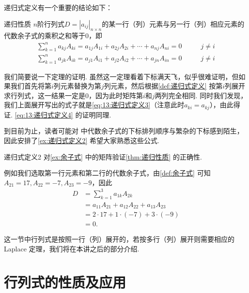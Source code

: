 递归式定义有一个重要的结论如下：
\begin{theorem}{}{递归性质}
    $n$阶行列式$D=|a_{ij}|_{n \times n}$的某一行（列）元素与另一行（列）相应元素的代数余子式的乘积之和等于0，即
    \begin{align}
        \label{eq:13:递归式定义3}
        \sum_{k=1}^{n}a_{kj}A_{ki}=a_{1j}A_{1i}+a_{2j}A_{2i}+\cdots+a_{nj}A_{ni}=0 & \qquad j \neq i \\
        \label{eq:13:递归式定义4}
        \sum_{k=1}^{n}a_{jk}A_{ik}=a_{j1}A_{i1}+a_{j2}A_{i2}+\cdots+a_{jn}A_{in}=0 & \qquad j \neq i
    \end{align}
\end{theorem}

我们简要说一下定理的证明. 虽然这一定理看着下标满天飞，似乎很难证明，但如果我们首先将第$i$列元素替换为第$j$列元素，然后根据\autoref{def:递归式定义} 按第$i$列展开求行列式，这一结果一定是0，因为此时矩阵第$i$和$j$两列完全相同. 同时我们发现，我们上面展开写出的式子就是\autoref{eq:13:递归式定义3}（注意此时$a_{ki}=a_{kj}$），由此得证. \autoref{eq:13:递归式定义4} 的证明同理.

到目前为止，读者可能对 中代数余子式的下标排列顺序与繁杂的下标感到陌生，因此安排了\autoref{ex:递归式定义2} 希望大家熟悉这些公式.

\begin{example}{}{递归式定义2}
    对\autoref{ex:余子式} 中的矩阵验证\autoref{thm:递归性质} 的正确性.
\end{example}

\begin{solution}
    例如我们选取第一行元素和第二行的代数余子式，由\autoref{def:余子式} 可知$A_{21}=17,A_{22}=-7,A_{23}=-9$，因此
    \begin{align*}
        D & =\sum_{k=1}^{3}a_{1k}A_{2k}             \\
          & =a_{11}A_{21}+a_{12}A_{22}+a_{13}A_{23} \\
          & =2 \cdot 17+1 \cdot (-7)+3 \cdot (-9)   \\
          & =0.
    \end{align*}
\end{solution}

这一节中行列式是按照一行（列）展开的，若按多行（列）展开则需要相应的 Laplace 定理，我们将在本讲之后的部分介绍.

\section{行列式的性质及应用}

